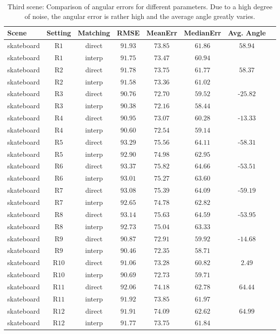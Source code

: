 \begin{appendix}
\begin{table}[tb]
	\centering
		\begin{tabular}{lccccccc}
Scene & Setting & Matching & RMSE & MeanErr & MedianErr & Avg. Angle \\
\hline  \hline
skateboard & R$1$ & direct & $91.93$ & $73.85$ & $61.86$ & $58.94$ & \\
skateboard & R$1$ & interp & $91.75$ & $73.47$ & $60.94$ &  & \\
skateboard & R$2$ & direct & $91.78$ & $73.75$ & $61.77$ & $58.37$ & \\
skateboard & R$2$ & interp & $91.58$ & $73.36$ & $61.02$ &  & \\
skateboard & R$3$ & direct & $90.76$ & $72.70$ & $59.52$ & -$25.82$ & \\
skateboard & R$3$ & interp & $90.38$ & $72.16$ & $58.44$ &  & \\
skateboard & R$4$ & direct & $90.95$ & $73.07$ & $60.28$ & -$13.33$ & \\
skateboard & R$4$ & interp & $90.60$ & $72.54$ & $59.14$ &  & \\
skateboard & R$5$ & direct & $93.29$ & $75.56$ & $64.11$ & -$58.31$ & \\
skateboard & R$5$ & interp & $92.90$ & $74.98$ & $62.95$ &  & \\
skateboard & R$6$ & direct & $93.37$ & $75.82$ & $64.66$ & -$53.51$ & \\
skateboard & R$6$ & interp & $93.01$ & $75.27$ & $63.60$ &  & \\
skateboard & R$7$ & direct & $93.08$ & $75.39$ & $64.09$ & -$59.19$ & \\
skateboard & R$7$ & interp & $92.65$ & $74.78$ & $62.82$ &  & \\
skateboard & R$8$ & direct & $93.14$ & $75.63$ & $64.59$ & -$53.95$ & \\
skateboard & R$8$ & interp & $92.73$ & $75.04$ & $63.33$ &  & \\
skateboard & R$9$ & direct & $90.87$ & $72.91$ & $59.92$ & -$14.68$ & \\
skateboard & R$9$ & interp & $90.46$ & $72.35$ & $58.71$ &  & \\
skateboard & R$10$ & direct & $91.06$ & $73.28$ & $60.82$ & $2.49$ & \\
skateboard & R$10$ & interp & $90.69$ & $72.73$ & $59.71$ &  & \\
skateboard & R$11$ & direct & $92.06$ & $74.18$ & $62.78$ & $64.44$ & \\
skateboard & R$11$ & interp & $91.92$ & $73.85$ & $61.97$ &  & \\
skateboard & R$12$ & direct & $91.91$ & $74.09$ & $62.62$ & $64.99$ & \\
skateboard & R$12$ & interp & $91.77$ & $73.75$ & $61.84$ &  & \\
		\end{tabular}
	\caption[Third scene: Comparison of angular errors for different parameters.]{Third scene: Comparison of angular errors for different parameters. 
	Due to a high degree of noise, the angular error is rather high and the average angle greatly varies.}
	\label{tab:app_error_comparison_skateboard}
\end{table}

	 
	 
\end{appendix}
